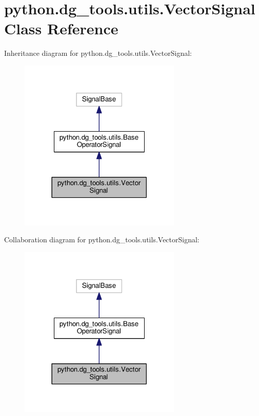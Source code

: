 \hypertarget{classpython_1_1dg__tools_1_1utils_1_1VectorSignal}{}\section{python.\+dg\+\_\+tools.\+utils.\+Vector\+Signal Class Reference}
\label{classpython_1_1dg__tools_1_1utils_1_1VectorSignal}


Inheritance diagram for python.\+dg\+\_\+tools.\+utils.\+Vector\+Signal\+:
\nopagebreak
\begin{figure}[H]
\begin{center}
\leavevmode
\includegraphics[width=218pt]{classpython_1_1dg__tools_1_1utils_1_1VectorSignal__inherit__graph}
\end{center}
\end{figure}


Collaboration diagram for python.\+dg\+\_\+tools.\+utils.\+Vector\+Signal\+:
\nopagebreak
\begin{figure}[H]
\begin{center}
\leavevmode
\includegraphics[width=218pt]{classpython_1_1dg__tools_1_1utils_1_1VectorSignal__coll__graph}
\end{center}
\end{figure}
